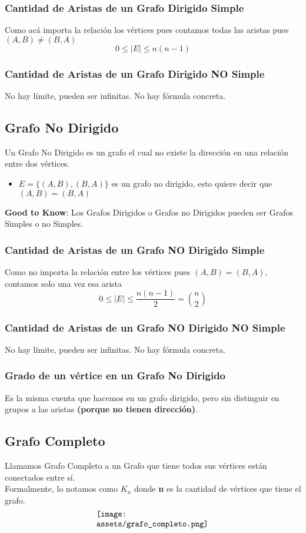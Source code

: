 \documentclass[10pt,a4paper]{article}
\begin{document}
\subsubsection*{Cantidad de Aristas de un Grafo Dirigido Simple}
Como acá importa la relación los vértices pues contamos todas las aristas pues $(A,B) \neq (B,A)$ \[0 \leq |E| \leq n(n-1)\]
\subsubsection*{Cantidad de Aristas de un Grafo Dirigido NO Simple}
No hay límite, pueden ser infinitas. No hay fórmula concreta.
\subsection*{Grafo No Dirigido}
Un Grafo No Dirigido es un grafo el cual no existe la dirección en una relación entre dos vértices.
\begin{itemize}
    \item $E = \{(A,B), (B, A) \}$ es un grafo no dirigido, esto quiere decir que $(A,B) = (B, A)$
\end{itemize}
\textbf{Good to Know}: Los Grafos Dirigidos o Grafos no Dirigidos pueden ser Grafos Simples o no Simples.
\subsubsection*{Cantidad de Aristas de un Grafo NO Dirigido Simple}
Como no importa la relación entre los vértices pues $(A,B) = (B,A)$, contamos solo una vez esa arista \[0 \leq |E| \leq \frac{n(n-1)}{2} = \binom{n}{2}\]
\subsubsection*{Cantidad de Aristas de un Grafo NO Dirigido NO Simple}
No hay límite, pueden ser infinitas. No hay fórmula concreta.
\subsubsection*{Grado de un vértice en un Grafo No Dirigido}
Es la misma cuenta que hacemos en un grafo dirigido, pero sin distinguir en grupos a las aristas \textbf{(porque no tienen dirección)}.
\subsection*{Grafo Completo}
Llamamos Grafo Completo a un Grafo que tiene todos sus vértices están conectados entre sí. \\
Formalmente, lo notamos como $K_{n}$ donde \textbf{n} es la cantidad de vértices que tiene el grafo.
\[\begin{minipage}[b]{0.4\textwidth}
    \texttt{[image: assets/grafo\_completo.png]}
\end{minipage}\]
\end{document}
